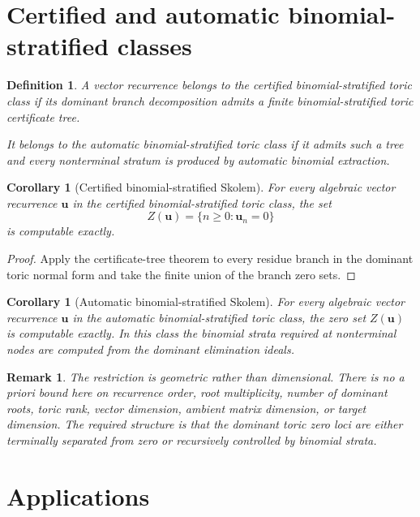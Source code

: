 \documentclass[11pt]{article}
\newtheorem{corollary}[theorem]{Corollary}
\newtheorem{definition}[theorem]{Definition}
\newtheorem{remark}[theorem]{Remark}
\begin{document}
\section{Certified and automatic binomial-stratified classes}

\begin{definition}
A vector recurrence belongs to the certified binomial-stratified toric class if its dominant branch decomposition admits a finite binomial-stratified toric certificate tree.

It belongs to the automatic binomial-stratified toric class if it admits such a tree and every nonterminal stratum is produced by automatic binomial extraction.
\end{definition}

\begin{corollary}[Certified binomial-stratified Skolem]
For every algebraic vector recurrence \(\mathbf u\) in the certified binomial-stratified toric class, the set
\[
Z(\mathbf u)=\{n\ge0:\mathbf u_n=0\}
\]
is computable exactly.
\end{corollary}

\begin{proof}
Apply the certificate-tree theorem to every residue branch in the dominant toric normal form and take the finite union of the branch zero sets.
\end{proof}

\begin{corollary}[Automatic binomial-stratified Skolem]
For every algebraic vector recurrence \(\mathbf u\) in the automatic binomial-stratified toric class, the zero set \(Z(\mathbf u)\) is computable exactly. In this class the binomial strata required at nonterminal nodes are computed from the dominant elimination ideals.
\end{corollary}

\begin{remark}
The restriction is geometric rather than dimensional. There is no a priori bound here on recurrence order, root multiplicity, number of dominant roots, toric rank, vector dimension, ambient matrix dimension, or target dimension. The required structure is that the dominant toric zero loci are either terminally separated from zero or recursively controlled by binomial strata.
\end{remark}

\section{Applications}
\end{document}
